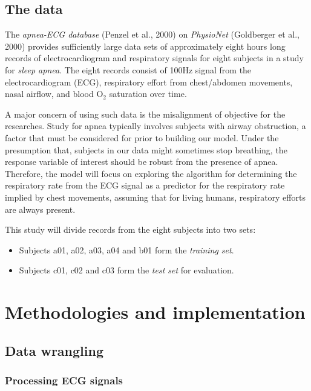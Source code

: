 \documentclass[
]{article}
\providecommand{\tightlist}{%
  \setlength{\itemsep}{0pt}\setlength{\parskip}{0pt}}
\begin{document}
\hypertarget{the-data}{%
\subsection{The data}\label{the-data}}

The \emph{apnea-ECG database} (Penzel et al., 2000) on \emph{PhysioNet}
(Goldberger et al., 2000) provides sufficiently large data sets of
approximately eight hours long records of electrocardiogram and
respiratory signals for eight subjects in a study for \emph{sleep
apnea}. The eight records consist of 100Hz signal from the
electrocardiogram (ECG), respiratory effort from chest/abdomen
movements, nasal airflow, and blood O\(_2\) saturation over time.

A major concern of using such data is the misalignment of objective for
the researches. Study for apnea typically involves subjects with airway
obstruction, a factor that must be considered for prior to building our
model. Under the presumption that, subjects in our data might sometimes
stop breathing, the response variable of interest should be robust from
the presence of apnea. Therefore, the model will focus on exploring the
algorithm for determining the respiratory rate from the ECG signal as a
predictor for the respiratory rate implied by chest movements, assuming
that for living humans, respiratory efforts are always present.

This study will divide records from the eight subjects into two sets:

\begin{itemize}
\tightlist
\item
  Subjects a01, a02, a03, a04 and b01 form the \emph{training set}.
\item
  Subjects c01, c02 and c03 form the \emph{test set} for evaluation.
\end{itemize}

\hypertarget{methodologies-and-implementation}{%
\section{Methodologies and
implementation}\label{methodologies-and-implementation}}

\hypertarget{data-wrangling}{%
\subsection{Data wrangling}\label{data-wrangling}}

\hypertarget{processing-ecg-signals}{%
\subsubsection{Processing ECG signals}\label{processing-ecg-signals}}
\end{document}
